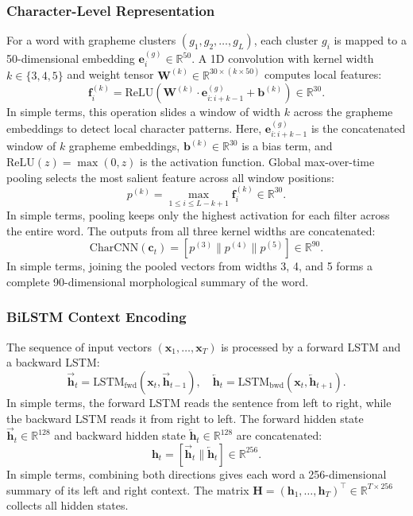 \documentclass[pdflatex,sn-mathphys-num]{sn-jnl}
\begin{document}
\subsubsection{Character-Level Representation}
For a word with grapheme clusters $(g_1, g_2, \ldots, g_{L})$, each cluster $g_i$ is mapped to a 50-dimensional embedding $\mathbf{e}^{(g)}_i \in \mathbb{R}^{50}$. A 1D convolution with kernel width $k \in \{3, 4, 5\}$ and weight tensor $\mathbf{W}^{(k)} \in \mathbb{R}^{30 \times (k \times 50)}$ computes local features:
\begin{equation}
\mathbf{f}^{(k)}_i = \text{ReLU}\left(\mathbf{W}^{(k)} \cdot \mathbf{e}^{(g)}_{i:i+k-1} + \mathbf{b}^{(k)}\right) \in \mathbb{R}^{30}.
\end{equation}
In simple terms, this operation slides a window of width $k$ across the grapheme embeddings to detect local character patterns. Here, $\mathbf{e}^{(g)}_{i:i+k-1}$ is the concatenated window of $k$ grapheme embeddings, $\mathbf{b}^{(k)} \in \mathbb{R}^{30}$ is a bias term, and $\text{ReLU}(z) = \max(0, z)$ is the activation function. Global max-over-time pooling selects the most salient feature across all window positions:
\begin{equation}
p^{(k)} = \max_{1 \le i \le L - k + 1} \mathbf{f}^{(k)}_i \in \mathbb{R}^{30}.
\end{equation}
In simple terms, pooling keeps only the highest activation for each filter across the entire word. The outputs from all three kernel widths are concatenated:
\begin{equation}
\text{CharCNN}(\mathbf{c}_t) = [p^{(3)} \parallel p^{(4)} \parallel p^{(5)}] \in \mathbb{R}^{90}.
\end{equation}
In simple terms, joining the pooled vectors from widths 3, 4, and 5 forms a complete 90-dimensional morphological summary of the word.

\subsubsection{BiLSTM Context Encoding}
The sequence of input vectors $(\mathbf{x}_1, \ldots, \mathbf{x}_T)$ is processed by a forward LSTM and a backward LSTM:
\begin{equation}
\overrightarrow{\mathbf{h}}_t = \text{LSTM}_{\text{fwd}}(\mathbf{x}_t, \overrightarrow{\mathbf{h}}_{t-1}), \quad
\overleftarrow{\mathbf{h}}_t = \text{LSTM}_{\text{bwd}}(\mathbf{x}_t, \overleftarrow{\mathbf{h}}_{t+1}).
\end{equation}
In simple terms, the forward LSTM reads the sentence from left to right, while the backward LSTM reads it from right to left. The forward hidden state $\overrightarrow{\mathbf{h}}_t \in \mathbb{R}^{128}$ and backward hidden state $\overleftarrow{\mathbf{h}}_t \in \mathbb{R}^{128}$ are concatenated:
\begin{equation}
\mathbf{h}_t = [\overrightarrow{\mathbf{h}}_t \parallel \overleftarrow{\mathbf{h}}_t] \in \mathbb{R}^{256}.
\end{equation}
In simple terms, combining both directions gives each word a 256-dimensional summary of its left and right context. The matrix $\mathbf{H} = (\mathbf{h}_1, \ldots, \mathbf{h}_T)^\top \in \mathbb{R}^{T \times 256}$ collects all hidden states.
\end{document}
